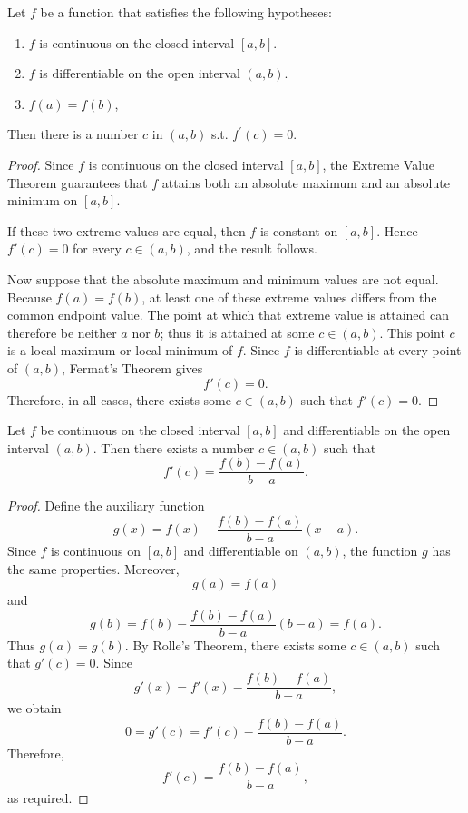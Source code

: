 \begin{theorem}
    Let \(f\) be a function that satisfies the following hypotheses:
    \begin{enumerate}
        \item \(f\) is continuous on the closed interval \([a, b]\). 
        \item \(f\) is differentiable on the open interval \((a, b)\). 
        \item \(f(a) = f(b)\),     
    \end{enumerate} 
    Then there is a number \(c\) in \((a, b)\) s.t. \(f^{\prime} (c) = 0\).   
\end{theorem}
\begin{proof}
    Since \(f\) is continuous on the closed interval \([a,b]\), the
    Extreme Value Theorem guarantees that \(f\) attains both an absolute
    maximum and an absolute minimum on \([a,b]\).

    If these two extreme values are equal, then \(f\) is constant on
    \([a,b]\).  Hence \(f'(c)=0\) for every \(c\in(a,b)\), and the result
    follows.

    Now suppose that the absolute maximum and minimum values are not equal.
    Because \(f(a)=f(b)\), at least one of these extreme values differs from
    the common endpoint value.  The point at which that extreme value is
    attained can therefore be neither \(a\) nor \(b\); thus it is attained
    at some \(c\in(a,b)\).  This point \(c\) is a local maximum or local
    minimum of \(f\).  Since \(f\) is differentiable at every point of
    \((a,b)\), Fermat's Theorem gives
    \[
        f'(c)=0.
    \]
    Therefore, in all cases, there exists some \(c\in(a,b)\) such that
    \(f'(c)=0\).
\end{proof}

\begin{theorem}
    Let \(f\) be continuous on the closed interval \([a,b]\) and
    differentiable on the open interval \((a,b)\).  Then there exists a
    number \(c\in(a,b)\) such that
    \[
        f'(c)=\frac{f(b)-f(a)}{b-a}.
    \]
\end{theorem}
\begin{proof}
    Define the auxiliary function
    \[
        g(x)=f(x)-\frac{f(b)-f(a)}{b-a}(x-a).
    \]
    Since \(f\) is continuous on \([a,b]\) and differentiable on
    \((a,b)\), the function \(g\) has the same properties.  Moreover,
    \[
        g(a)=f(a)
    \]
    and
    \[
        g(b)
        =f(b)-\frac{f(b)-f(a)}{b-a}(b-a)
        =f(a).
    \]
    Thus \(g(a)=g(b)\).  By Rolle's Theorem, there exists some
    \(c\in(a,b)\) such that \(g'(c)=0\).  Since
    \[
        g'(x)=f'(x)-\frac{f(b)-f(a)}{b-a},
    \]
    we obtain
    \[
        0=g'(c)=f'(c)-\frac{f(b)-f(a)}{b-a}.
    \]
    Therefore,
    \[
        f'(c)=\frac{f(b)-f(a)}{b-a},
    \]
    as required.
\end{proof}

